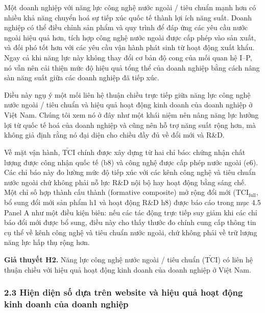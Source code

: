 \documentclass[12pt,a4paper]{article}
\begin{document}
Một doanh nghiệp với năng lực công nghệ nước ngoài / tiêu chuẩn mạnh hơn
có nhiều khả năng chuyển hoá sự tiếp xúc quốc tế thành lợi ích năng
suất. Doanh nghiệp có thể điều chỉnh sản phẩm và quy trình để đáp ứng
các yêu cầu nước ngoài hiệu quả hơn, tích hợp công nghệ nước ngoài được
cấp phép vào sản xuất, và đối phó tốt hơn với các yêu cầu vận hành phát
sinh từ hoạt động xuất khẩu. Ngay cả khi năng lực này không thay đổi cơ
bản độ cong của mối quan hệ I--P, nó vẫn nên cải thiện mức độ hiệu quả
tổng thể của doanh nghiệp bằng cách nâng sàn năng suất giữa các doanh
nghiệp đã tiếp xúc.

Điều này ngụ ý một mối liên hệ thuận chiều trực tiếp giữa năng lực công
nghệ nước ngoài / tiêu chuẩn và hiệu quả hoạt động kinh doanh của doanh
nghiệp ở Việt Nam. Chúng tôi xem nó ở đây như một khái niệm nên nâng
năng lực hưởng lợi từ quốc tế hoá của doanh nghiệp và cũng nên hỗ trợ
năng suất rộng hơn, mà không giả định rằng nó đại diện cho chiều đầy đủ
về đổi mới và R\&D.

Về mặt vận hành, \(\tilde{\mathrm{TCI}}\) chính được xây dựng từ hai chỉ
báo: chứng nhận chất lượng được công nhận quốc tế (b8) và công nghệ được
cấp phép nước ngoài (e6). Các chỉ báo này đo lường mức độ tiếp xúc với
các kênh công nghệ và tiêu chuẩn nước ngoài chứ không phải nỗ lực R\&D
nội bộ hay hoạt động bằng sáng chế. Một chỉ số hợp thành cấu thành
(formative composite) mở rộng đổi mới (\(\mathrm{TCI}_{\text{full}}\),
bổ sung đổi mới sản phẩm h1 và hoạt động R\&D h8) được báo cáo trong mục
4.5 Panel A như một điều kiện biên: nếu các tác động trực tiếp suy giảm
khi các chỉ báo đổi mới được bổ sung, điều này cho thấy thước đo chính
cung cấp thông tin cụ thể về kênh công nghệ và tiêu chuẩn nước ngoài,
chứ không phải về trữ lượng năng lực hấp thụ rộng hơn.

\textbf{Giả thuyết H2.} Năng lực công nghệ nước ngoài / tiêu chuẩn
(\(\tilde{\mathrm{TCI}}\)) có liên hệ thuận chiều với hiệu quả hoạt động
kinh doanh của doanh nghiệp ở Việt Nam.

\hypertarget{23-hiux1ec7n-diux1ec7n-sux1ed1-dux1ef1a-truxean-website-vuxe0-hiux1ec7u-quux1ea3-houx1ea1t-ux111ux1ed9ng-kinh-doanh-cux1ee7a-doanh-nghiux1ec7p}{%
\subsubsection{2.3 Hiện diện số dựa trên website và hiệu quả hoạt động
kinh doanh của doanh
nghiệp}\label{23-hiux1ec7n-diux1ec7n-sux1ed1-dux1ef1a-truxean-website-vuxe0-hiux1ec7u-quux1ea3-houx1ea1t-ux111ux1ed9ng-kinh-doanh-cux1ee7a-doanh-nghiux1ec7p}}
\end{document}
